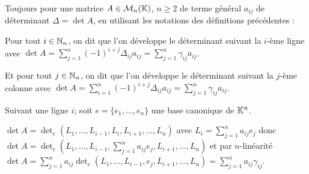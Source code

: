 \begin{theoreme}
Toujours pour une matrice $A\in\mathcal{M}_n(\mathbb{K})$, $n\geq2$ de terme général $a_{ij}$ de déterminant $\Delta=\det A$, en utilisant les notations des définitions précédentes :

Pour tout $i\in\mathbb{N}_n$, on dit que l'on développe le déterminant suivant la $i$-ème ligne avec $\displaystyle \det A=\sum_{j=1}^n (-1)^{i+j}\Delta_{ij}a_{ij}=\sum_{j=1}^n \gamma_{ij}a_{ij}$.

Et pour tout $j\in\mathbb{N}_n$, on dit que l'on développe le déterminant suivant la $j$-ème colonne avec $\displaystyle \det A=\sum_{i=1}^n (-1)^{i+j}\Delta_{ij}a_{ij}=\sum_{j=1}^n \gamma_{ij}a_{ij}$.

\tcblower

Suivant une ligne $i$; soit $e=\{e_1,\dots,e_n\}$ une base canonique de $\mathbb{K}^n$.

$\displaystyle\det A =\det_e(L_1,\dots,L_{i-1},L_{i},L_{i+1},\dots,L_n)$ avec $\displaystyle L_i=\sum_{j=1}^n a_{ij}e_j$
donc $\displaystyle \det A =\det_e(L_1,\dots,L_{i-1},\sum_{j=1}^n a_{ij}e_j,L_{i+1},\dots,L_n)$ et par $n$-linéarité
$\displaystyle \det A =\sum_{j=1}^n a_{ij}\det_e(L_1,\dots,L_{i-1},e_j,L_{i+1},\dots,L_n)=\sum_{j=1}^n a_{ij}\gamma_{ij}$.
\end{theoreme}